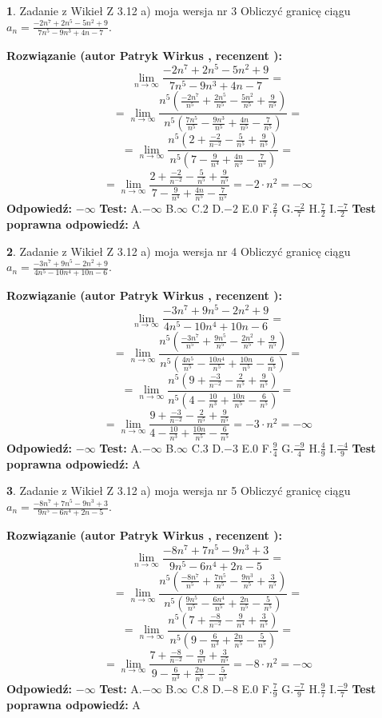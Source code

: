 \documentclass[12pt, a4paper]{article}
\theoremstyle{definition} %
\newtheorem{zad}{}
\newcommand{\zadStart}[1]{\begin{zad}#1\newline}
\newcommand{\zadStop}{\end{zad}}
\newcommand{\rozwStart}[2]{\noindent \textbf{Rozwiązanie (autor #1 , recenzent #2): }\newline}
\newcommand{\rozwStop}{\newline}
\newcommand{\odpStart}{\noindent \textbf{Odpowiedź:}\newline}
\newcommand{\odpStop}{\newline}
\newcommand{\testStart}{\noindent \textbf{Test:}\newline}
\newcommand{\testStop}{\newline}
\newcommand{\kluczStart}{\noindent \textbf{Test poprawna odpowiedź:}\newline}
\newcommand{\kluczStop}{\newline}
\begin{document}
\zadStart{Zadanie z Wikieł Z 3.12 a) moja wersja nr 3}
Obliczyć granicę ciągu $a_{n}=\frac{-2n^{7}+2n^{5}-5n^{2}+9}{7n^{5}-9n^{3}+4n-7}$.
\zadStop
\rozwStart{Patryk Wirkus}{}
$$\lim\limits_{n\to\infty}\frac{-2n^{7}+2n^{5}-5n^{2}+9}{7n^{5}-9n^{3}+4n-7}=$$
$$=\lim\limits_{n\to\infty}\frac{n^{5}\left(\frac{-2n^{7}}{n^{5}}+\frac{2n^{5}}{n^{5}}-\frac{5n^{2}}{n^{5}}+\frac{9}{n^{5}}\right)}{n^{5}\left(\frac{7n^{5}}{n^{5}}-\frac{9n^{3}}{n^{5}}+\frac{4n}{n^{5}}-\frac{7}{n^{5}}\right)}=$$
$$=\lim\limits_{n\to\infty}\frac{n^{5}\left(2+\frac{-2}{n^{-2}}-\frac{5}{n^{5}}+\frac{9}{n^{5}}\right)}
{n^{5}\left(7-\frac{9}{n^{4}}+\frac{4n}{n^{5}}-\frac{7}{n^{5}}\right)}=$$
$$=\lim\limits_{n\to\infty}\frac{2+\frac{-2}{n^{-2}}-\frac{5}{n^{5}}+\frac{9}{n^{5}}}{7-\frac{9}{n^{4}}+\frac{4n}{n^{5}}-\frac{7}{n^{5}}}=-2\cdot n^{2} = -\infty$$
\rozwStop
\odpStart
$-\infty$
\odpStop
\testStart
A.$-\infty$
B.$\infty$
C.$2$
D.$-2$
E.$0$
F.$\frac{2}{7}$
G.$\frac{-2}{7}$
H.$\frac{7}{2}$
I.$\frac{-7}{2}$
\testStop
\kluczStart
A
\kluczStop



\zadStart{Zadanie z Wikieł Z 3.12 a) moja wersja nr 4}
Obliczyć granicę ciągu $a_{n}=\frac{-3n^{7}+9n^{5}-2n^{2}+9}{4n^{5}-10n^{4}+10n-6}$.
\zadStop
\rozwStart{Patryk Wirkus}{}
$$\lim\limits_{n\to\infty}\frac{-3n^{7}+9n^{5}-2n^{2}+9}{4n^{5}-10n^{4}+10n-6}=$$
$$=\lim\limits_{n\to\infty}\frac{n^{5}\left(\frac{-3n^{7}}{n^{5}}+\frac{9n^{5}}{n^{5}}-\frac{2n^{2}}{n^{5}}+\frac{9}{n^{5}}\right)}{n^{5}\left(\frac{4n^{5}}{n^{5}}-\frac{10n^{4}}{n^{5}}+\frac{10n}{n^{5}}-\frac{6}{n^{5}}\right)}=$$
$$=\lim\limits_{n\to\infty}\frac{n^{5}\left(9+\frac{-3}{n^{-2}}-\frac{2}{n^{5}}+\frac{9}{n^{5}}\right)}
{n^{5}\left(4-\frac{10}{n^{3}}+\frac{10n}{n^{5}}-\frac{6}{n^{5}}\right)}=$$
$$=\lim\limits_{n\to\infty}\frac{9+\frac{-3}{n^{-2}}-\frac{2}{n^{5}}+\frac{9}{n^{5}}}{4-\frac{10}{n^{3}}+\frac{10n}{n^{5}}-\frac{6}{n^{5}}}=-3\cdot n^{2} = -\infty$$
\rozwStop
\odpStart
$-\infty$
\odpStop
\testStart
A.$-\infty$
B.$\infty$
C.$3$
D.$-3$
E.$0$
F.$\frac{9}{4}$
G.$\frac{-9}{4}$
H.$\frac{4}{9}$
I.$\frac{-4}{9}$
\testStop
\kluczStart
A
\kluczStop



\zadStart{Zadanie z Wikieł Z 3.12 a) moja wersja nr 5}
Obliczyć granicę ciągu $a_{n}=\frac{-8n^{7}+7n^{5}-9n^{3}+3}{9n^{5}-6n^{4}+2n-5}$.
\zadStop
\rozwStart{Patryk Wirkus}{}
$$\lim\limits_{n\to\infty}\frac{-8n^{7}+7n^{5}-9n^{3}+3}{9n^{5}-6n^{4}+2n-5}=$$
$$=\lim\limits_{n\to\infty}\frac{n^{5}\left(\frac{-8n^{7}}{n^{5}}+\frac{7n^{5}}{n^{5}}-\frac{9n^{3}}{n^{5}}+\frac{3}{n^{5}}\right)}{n^{5}\left(\frac{9n^{5}}{n^{5}}-\frac{6n^{4}}{n^{5}}+\frac{2n}{n^{5}}-\frac{5}{n^{5}}\right)}=$$
$$=\lim\limits_{n\to\infty}\frac{n^{5}\left(7+\frac{-8}{n^{-2}}-\frac{9}{n^{4}}+\frac{3}{n^{5}}\right)}
{n^{5}\left(9-\frac{6}{n^{3}}+\frac{2n}{n^{5}}-\frac{5}{n^{5}}\right)}=$$
$$=\lim\limits_{n\to\infty}\frac{7+\frac{-8}{n^{-2}}-\frac{9}{n^{4}}+\frac{3}{n^{5}}}{9-\frac{6}{n^{3}}+\frac{2n}{n^{5}}-\frac{5}{n^{5}}}=-8\cdot n^{2} = -\infty$$
\rozwStop
\odpStart
$-\infty$
\odpStop
\testStart
A.$-\infty$
B.$\infty$
C.$8$
D.$-8$
E.$0$
F.$\frac{7}{9}$
G.$\frac{-7}{9}$
H.$\frac{9}{7}$
I.$\frac{-9}{7}$
\testStop
\kluczStart
A
\kluczStop
\end{document}
